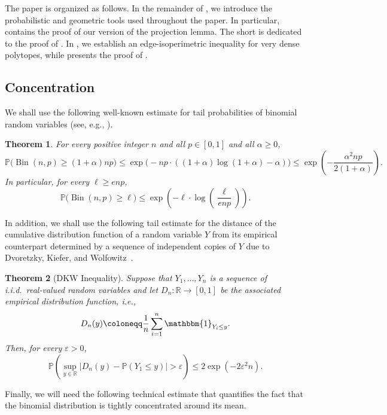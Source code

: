 \documentclass[11pt,a4paper,oneside,reqno]{amsart}
\newtheorem{theorem}{Theorem}[section]
\newcommand{\PP}{\mathbb{P}}
\DeclareMathOperator{\Bin}{Bin}
\newcommand{\eps}{\varepsilon}
\def\1{\mathbbm{1}}
\begin{document}
The paper is organized as follows. In the remainder of , we introduce the probabilistic and geometric tools used throughout the paper. In particular,  contains the proof of our version of the projection lemma.  The short  is dedicated to the proof of .  In , we establish an edge-isoperimetric inequality for very dense polytopes, while  presents the proof of .

\subsection{Concentration}

We shall use the following well-known estimate for tail probabilities of binomial random variables (see, e.g., \cite[Theorem~2.1]{JRLrandomgraphs}).

\begin{theorem}\label{chernoff}
  For every positive integer $n$ and all $p \in [0,1]$ and all $\alpha \ge 0$,
  \[
    \PP\bigl(\Bin(n,p) \ge (1+\alpha) n p\bigr) \le \exp\bigl(-np \cdot ((1+\alpha) \log (1+\alpha) - \alpha)\bigr) \le \exp\left(-\frac{\alpha^2np}{2(1+\alpha)}\right).
  \]
  In particular, for every $\ell \ge enp$,
  \[
    \PP\bigl(\Bin(n,p) \ge \ell\bigr) \le \exp\left( -\ell\cdot\log\left(\frac{\ell}{enp}\right)\right).
  \]
\end{theorem}

In addition, we shall use the following tail estimate for the distance of the cumulative distribution function of a random variable $Y$ from its empirical counterpart determined by a sequence of independent copies of $Y$ due to Dvoretzky, Kiefer, and Wolfowitz~\cite{DvoKieWol56}.
\begin{theorem}[DKW Inequality]
  \label{thm:DKW}
  Suppose that $Y_1, \dotsc, Y_n$ is a sequence of i.i.d.\ real-valued random variables and let $D_n \colon \mathbb{R} \to [0,1]$ be the associated empirical distribution function, i.e.,
  \[
    D_n(y) \coloneqq \frac{1}{n} \sum_{i =1}^n \1_{Y_i \le y}.
  \]
  Then, for every $\eps > 0$,
  \[
    \PP\left(\sup_{y \in \mathbb{R}} \bigl|D_n(y) - \PP(Y_1 \le y)\bigr| > \eps\right) \le 2\exp(-2\eps^2n).
  \]
\end{theorem}

Finally, we will need the following technical estimate that quantifies the fact that the binomial distribution is tightly concentrated around its mean.
\end{document}
